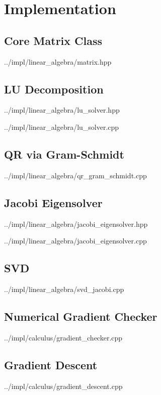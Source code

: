 \appendix

\chapter{Implementation}

\section{Core Matrix Class}\label{app:matrix-class}

{../impl/linear_algebra/matrix.hpp}

\section{LU Decomposition}\label{app:lu-solver}

{../impl/linear_algebra/lu_solver.hpp}

{../impl/linear_algebra/lu_solver.cpp}

\section{QR via Gram-Schmidt}\label{app:qr-solver}

{../impl/linear_algebra/qr_gram_schmidt.cpp}

\section{Jacobi Eigensolver}\label{app:jacobi-solver}

{../impl/linear_algebra/jacobi_eigensolver.hpp}

{../impl/linear_algebra/jacobi_eigensolver.cpp}

\section{SVD}\label{app:svd-jacobi}

{../impl/linear_algebra/svd_jacobi.cpp}

\section{Numerical Gradient Checker}\label{app:gradient-checker}

{../impl/calculus/gradient_checker.cpp}

\section{Gradient Descent}\label{app:gradient-descent}

{../impl/calculus/gradient_descent.cpp}

